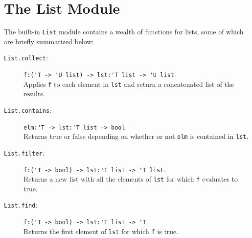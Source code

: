 \documentclass[fsharpNotes.tex]{subfiles}
\begin{document}
\section{The List Module}
The built-in \lstinline{List} module contains a wealth of functions for lists, some of which are
briefly summarized below:
\begin{description}
\item[\texttt{List.collect}:] \lstinline{f:('T -> 'U list) -> lst:'T list -> 'U list}.~\\
  Applies \lstinline{f} to each element in \lstinline{lst} and return a concatenated list of the results.
\item[\texttt{List.contains}:] \lstinline{elm:'T -> lst:'T list -> bool}.~\\
  Returns true or false depending on whether or not \lstinline{elm} is contained in \lstinline{lst}.
\item[\texttt{List.filter}:] \lstinline{f:('T -> bool) -> lst:'T list -> 'T list}.~\\
  Returns a new list with all the elements of \lstinline{lst} for which \lstinline{f} evaluates to true.
\item[\texttt{List.find}:] \lstinline{f:('T -> bool) -> lst:'T list -> 'T}.~\\
  Returns the first element of \lstinline{lst} for which \lstinline{f} is true.

\end{description}
\end{document}

